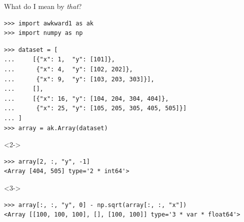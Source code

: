 \documentclass[aspectratio=169]{beamer}
\begin{document}


\begin{frame}[fragile]{What do I mean by {\it that}?}
\vspace{0.3 cm}

\small
\begin{verbatim}
>>> import awkward1 as ak
>>> import numpy as np
\end{verbatim}

\begin{verbatim}
>>> dataset = [
...     [{"x": 1,  "y": [101]},
...      {"x": 4,  "y": [102, 202]},
...      {"x": 9,  "y": [103, 203, 303]}],
...     [],
...     [{"x": 16, "y": [104, 204, 304, 404]},
...      {"x": 25, "y": [105, 205, 305, 405, 505]}]
... ]
>>> array = ak.Array(dataset)
\end{verbatim}

\begin{uncoverenv}<2->
\begin{verbatim}
>>> array[2, :, "y", -1]
<Array [404, 505] type='2 * int64'>
\end{verbatim}
\end{uncoverenv}

\begin{uncoverenv}<3->
\begin{verbatim}
>>> array[:, :, "y", 0] - np.sqrt(array[:, :, "x"])
<Array [[100, 100, 100], [], [100, 100]] type='3 * var * float64'>
\end{verbatim}
\end{uncoverenv}
\end{frame}
\end{document}
